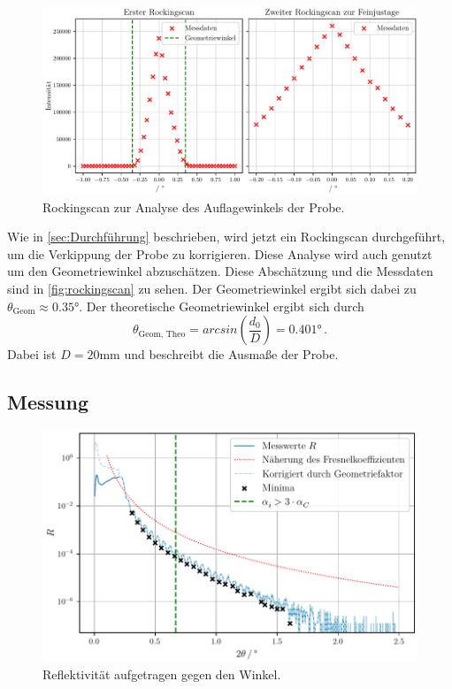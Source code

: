 \begin{figure}
    \centering
    \includegraphics[width = 0.5 \linewidth]{build/rockingscan.pdf}
    \caption{Rockingscan zur Analyse des Auflagewinkels der Probe.}
    \label{fig:rockingscan}
\end{figure}

Wie in \autoref{sec:Durchführung} beschrieben, wird jetzt ein Rockingscan durchgeführt, um die Verkippung der Probe zu korrigieren.
Diese Analyse wird auch genutzt um den Geometriewinkel abzuschätzen.
Diese Abschätzung und die Messdaten sind in \autoref{fig:rockingscan} zu sehen.
Der Geometriewinkel ergibt sich dabei zu $\theta_\text{Geom} \approx 0.35 °$.
Der theoretische Geometriewinkel ergibt sich durch 
\begin{equation*}
    \theta_\text{Geom, Theo} = arcsin\left(\frac{d_0}{D}\right) = 0.401 \unit\degree \, .
\end{equation*}
Dabei ist $D = 20 \unit{\milli\meter}$ und beschreibt die Ausmaße der Probe.

\subsection{Messung}

\begin{figure}
    \centering
    \includegraphics[width = 0.5 \linewidth]{build/messung1.pdf}
    \caption{Reflektivität aufgetragen gegen den Winkel.}
    \label{fig:messreihe1}
\end{figure}

